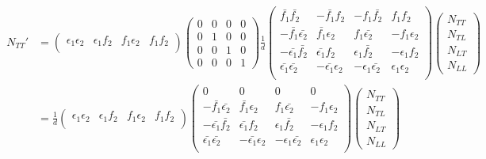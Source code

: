 \begin{align}
\begin{split}
N_{TT}'
&=
\left( \begin{array}{cccc}
\epsilon_1 \epsilon_2 & \epsilon_1 f_2 & f_1 \epsilon_2 & f_1 f_2 \\
\end{array} \right)
\left( \begin{array}{cccc}
0 & 0 & 0 & 0 \\
0 & 1 & 0 & 0 \\
0 & 0 & 1 & 0 \\
0 & 0 & 0 & 1
\end{array} \right)
\frac{1}{d}
\left( \begin{array}{cccc}
  \bar{f_1}        \bar{f_2}        & - \bar{f_1}        f_2        & - f_1        \bar{f_2}        &   f_1        f_2        \\
- \bar{f_1}        \bar{\epsilon_2} &   \bar{f_1}        \epsilon_2 &   f_1        \bar{\epsilon_2} & - f_1        \epsilon_2 \\
- \bar{\epsilon_1} \bar{f_2}        &   \bar{\epsilon_1} f_2        &   \epsilon_1 \bar{f_2}        & - \epsilon_1 f_2        \\
  \bar{\epsilon_1} \bar{\epsilon_2} & - \bar{\epsilon_1} \epsilon_2 & - \epsilon_1 \bar{\epsilon_2} &   \epsilon_1 \epsilon_2 \\
\end{array} \right)
\left( \begin{array}{c}
N_{TT} \\
N_{TL} \\
N_{LT} \\
N_{LL}
\end{array} \right) \\
&=
\frac{1}{d}
\left( \begin{array}{cccc}
\epsilon_1 \epsilon_2 & \epsilon_1 f_2 & f_1 \epsilon_2 & f_1 f_2 \\
\end{array} \right)
\left( \begin{array}{cccc}
  0                                 &   0                           &   0                           &   0                     \\
- \bar{f_1}        \bar{\epsilon_2} &   \bar{f_1}        \epsilon_2 &   f_1        \bar{\epsilon_2} & - f_1        \epsilon_2 \\
- \bar{\epsilon_1} \bar{f_2}        &   \bar{\epsilon_1} f_2        &   \epsilon_1 \bar{f_2}        & - \epsilon_1 f_2        \\
  \bar{\epsilon_1} \bar{\epsilon_2} & - \bar{\epsilon_1} \epsilon_2 & - \epsilon_1 \bar{\epsilon_2} &   \epsilon_1 \epsilon_2 \\
\end{array} \right)
\left( \begin{array}{c}
N_{TT} \\
N_{TL} \\
N_{LT} \\
N_{LL}
\end{array} \right) \\
\end{split}
\end{align}
